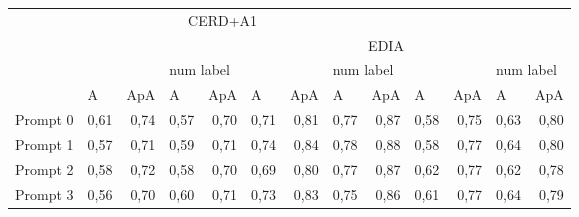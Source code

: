 \begin{tabular}{lrrrrrrrrrrrr}
                  & \multicolumn{7}{c}{CERD+A1}                                                                                                                                                 & \multicolumn{1}{l}{}    & \multicolumn{2}{l}{}                            & \multicolumn{2}{l}{}                            \\
                  & \multicolumn{1}{l}{}  & \multicolumn{1}{l}{}    & \multicolumn{1}{l}{}  & \multicolumn{1}{l}{}    & \multicolumn{7}{c}{EDIA}                                                                                                                                                    & \multicolumn{1}{l}{}    \\
\multirow{2}{*}{} & \multicolumn{2}{l}{}                            & \multicolumn{2}{l}{num label}                   & \multicolumn{2}{l}{}                            & \multicolumn{2}{l}{num label}                   & \multicolumn{2}{l}{}                            & \multicolumn{2}{l}{num label}                   \\
                  & \multicolumn{1}{l}{A} & \multicolumn{1}{l}{ApA} & \multicolumn{1}{l}{A} & \multicolumn{1}{l}{ApA} & \multicolumn{1}{l}{A} & \multicolumn{1}{l}{ApA} & \multicolumn{1}{l}{A} & \multicolumn{1}{l}{ApA} & \multicolumn{1}{l}{A} & \multicolumn{1}{l}{ApA} & \multicolumn{1}{l}{A} & \multicolumn{1}{l}{ApA} \\
Prompt 0          & 0,61                  & 0,74                    & 0,57                  & 0,70                    & 0,71                  & 0,81                    & 0,77                  & 0,87                    & 0,58                  & 0,75                    & 0,63                  & 0,80                    \\
Prompt 1          & 0,57                  & 0,71                    & 0,59                  & 0,71                    & 0,74                  & 0,84                    & 0,78                  & 0,88                    & 0,58                  & 0,77                    & 0,64                  & 0,80                    \\
Prompt 2          & 0,58                  & 0,72                    & 0,58                  & 0,70                    & 0,69                  & 0,80                    & 0,77                  & 0,87                    & 0,62                  & 0,77                    & 0,62                  & 0,78                    \\
Prompt 3          & 0,56                  & 0,70                    & 0,60                  & 0,71                    & 0,73                  & 0,83                    & 0,75                  & 0,86                    & 0,61                  & 0,77                    & 0,64                  & 0,79                    \\

\end{tabular}
